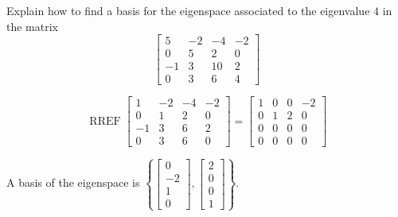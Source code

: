 
\begin{exerciseStatement}


Explain how to find a basis for the eigenspace associated to the eigenvalue \( 4 \) in the matrix \[ \left[\begin{array}{cccc}
5 & -2 & -4 & -2 \\
0 & 5 & 2 & 0 \\
-1 & 3 & 10 & 2 \\
0 & 3 & 6 & 4
\end{array}\right] \]


\end{exerciseStatement}
    
\begin{exerciseAnswer} 


\[\operatorname{RREF} \left[\begin{array}{cccc}
1 & -2 & -4 & -2 \\
0 & 1 & 2 & 0 \\
-1 & 3 & 6 & 2 \\
0 & 3 & 6 & 0
\end{array}\right] = \left[\begin{array}{cccc}
1 & 0 & 0 & -2 \\
0 & 1 & 2 & 0 \\
0 & 0 & 0 & 0 \\
0 & 0 & 0 & 0
\end{array}\right] \]



A basis of the eigenspace is \( \left\{ \left[\begin{array}{c}
0 \\
-2 \\
1 \\
0
\end{array}\right] , \left[\begin{array}{c}
2 \\
0 \\
0 \\
1
\end{array}\right] \right\} \).


\end{exerciseAnswer}
    

